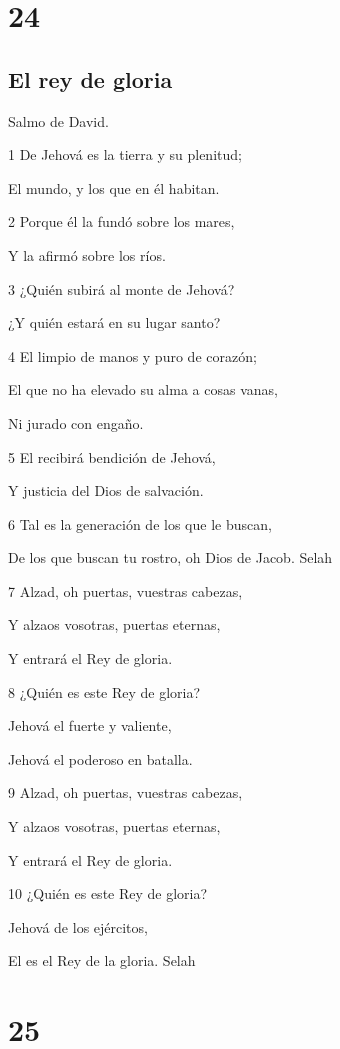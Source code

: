 \chapter{24}

\section*{El rey de gloria}

\par Salmo de David.

\par 1 De Jehová es la tierra y su plenitud;
\par El mundo, y los que en él habitan.
\par 2 Porque él la fundó sobre los mares,
\par Y la afirmó sobre los ríos.
\par 3 ¿Quién subirá al monte de Jehová?
\par ¿Y quién estará en su lugar santo?
\par 4 El limpio de manos y puro de corazón;
\par El que no ha elevado su alma a cosas vanas,
\par Ni jurado con engaño.
\par 5 El recibirá bendición de Jehová,
\par Y justicia del Dios de salvación.
\par 6 Tal es la generación de los que le buscan,
\par De los que buscan tu rostro, oh Dios de Jacob. Selah
\par 7 Alzad, oh puertas, vuestras cabezas,
\par Y alzaos vosotras, puertas eternas,
\par Y entrará el Rey de gloria.
\par 8 ¿Quién es este Rey de gloria?
\par Jehová el fuerte y valiente,
\par Jehová el poderoso en batalla.
\par 9 Alzad, oh puertas, vuestras cabezas,
\par Y alzaos vosotras, puertas eternas,
\par Y entrará el Rey de gloria.
\par 10 ¿Quién es este Rey de gloria?
\par Jehová de los ejércitos,
\par El es el Rey de la gloria. Selah

\chapter{25}

